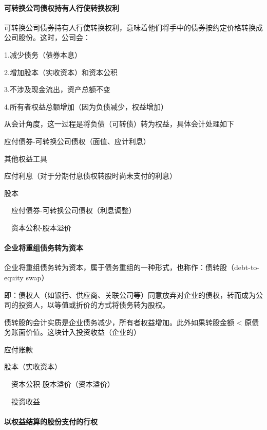 \documentclass[UTF8,12pt]{ctexart}
\newenvironment{Dr}{%
	\begin{list}{}%
		{
			\setlength{\leftmargin}{2em}
			\setlength{\labelwidth}{2em}
			\setlength{\labelsep}{0pt}
			\setlength{\itemindent}{0pt}
			\setlength{\listparindent}{0pt}
			\setlength{\parsep}{0pt}
			\setlength{\topsep}{0pt}
		}
		\item[\textbf{借：}]
	}{%
	\end{list}
}
\newenvironment{Cr}{%
	\begin{list}{}%
		{
			\setlength{\leftmargin}{2em}
			\setlength{\labelwidth}{2em}
			\setlength{\labelsep}{0pt}
			\setlength{\itemindent}{0pt}
			\setlength{\listparindent}{0pt}
			\setlength{\parsep}{0pt}
			\setlength{\topsep}{0pt}
		}
		\item[\textbf{贷：}]
	}{%
	\end{list}
}
\numberwithin{equation}{section} %
\numberwithin{figure}{section}
\numberwithin{table}{section}
\begin{document}
	\paragraph{可转换公司债权持有人行使转换权利}
	可转换公司债券持有人行使转换权利，意味着他们将手中的债券按约定价格转换成公司股份。这时，公司会：
	
	1.减少债务（债券本息）
	
	2.增加股本（实收资本）和资本公积
	
	3.不涉及现金流出，资产总额不变
	
	4.所有者权益总额增加（因为负债减少，权益增加）
	
	从会计角度，这一过程是将负债（可转债）转为权益，具体会计处理如下
	
	\begin{Dr}
		应付债券-可转换公司债权（面值、应计利息）
		
		其他权益工具
		
		应付利息（对于分期付息债权转股时尚未支付的利息）
	\end{Dr}
	\begin{Cr}
		股本
		
		\ \ 应付债券-可转换公司债权（利息调整）
		
		\ \ 资本公积-股本溢价
	\end{Cr}

	\paragraph{企业将重组债务转为资本}
	企业将重组债务转为资本，属于债务重组的一种形式，也称作：债转股（debt-to-equity swap）
	
	即：债权人（如银行、供应商、关联公司等）同意放弃对企业的债权，转而成为公司的投资人，以等值或折价的方式将债务转为股权。
	
	债转股的会计实质是企业债务减少，所有者权益增加。此外如果转股金额 < 原债务账面价值。这块计入投资收益（企业的）
	
	
	\begin{Dr}
		应付账款
	\end{Dr}
	\begin{Cr}
		股本（实收资本）
		
		\ \ 资本公积-股本溢价（资本溢价）
		
		\ \ 投资收益
	\end{Cr}

	\paragraph{以权益结算的股份支付的行权}
	
\end{document}
